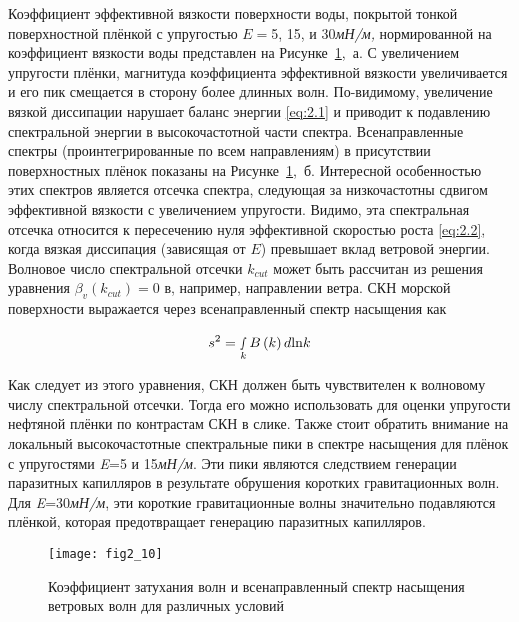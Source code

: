 Коэффициент эффективной вязкости поверхности воды, покрытой тонкой поверхностной плёнкой с упругостью $E=$5, 15, и 30\textit{мН/м,} нормированной на коэффициент вязкости воды представлен на Рисунке~\ref{fig:2.10},~а. С увеличением упругости плёнки, магнитуда коэффициента эффективной вязкости увеличивается и его пик смещается в сторону более длинных волн. По-видимому, увеличение вязкой диссипации нарушает баланс энергии \eqref{eq:2.1} и приводит к подавлению спектральной энергии в высокочастотной части спектра. Всенаправленные спектры (проинтегрированные по всем направлениям) в присутствии поверхностных плёнок показаны на Рисунке~\ref{fig:2.10},~б. Интересной особенностью этих спектров является отсечка спектра, следующая за низкочастотны сдвигом эффективной вязкости с увеличением упругости. Видимо, эта спектральная отсечка относится к пересечению нуля эффективной скоростью роста \eqref{eq:2.2}, когда вязкая диссипация (зависящая от $E$) превышает вклад ветровой энергии. Волновое число спектральной отсечки $k_{cut} $ может быть рассчитан из решения уравнения $\beta _{v} (k_{cut} )=0$ в, например, направлении ветра. СКН морской поверхности выражается через всенаправленный спектр насыщения как



\begin{equation} \label{eq:2.3} 
s^{2} =\mathop{\smallint }\limits_{k}^{} B\left(k\right)d{\rm ln}k 
\end{equation} 


Как следует из этого уравнения, СКН должен быть чувствителен к волновому числу спектральной отсечки. Тогда его можно использовать для оценки упругости нефтяной плёнки по контрастам СКН в слике. Также стоит обратить внимание на локальный высокочастотные спектральные пики в спектре насыщения для плёнок с упругостями \textit{E}=5 и 15\textit{мН/м}. Эти пики являются следствием генерации паразитных капилляров в результате обрушения коротких гравитационных волн. Для \textit{E}=30\textit{мН/м}, эти короткие гравитационные волны значительно подавляются плёнкой, которая предотвращает генерацию паразитных капилляров.



\begin{figure}[!ht]
   	\centering
	{\texttt{[image: fig2\_10]}}
    \\
    \caption{Коэффициент затухания волн и всенаправленный спектр насыщения ветровых волн для различных условий}
    \label{fig:2.10}
\end{figure}


